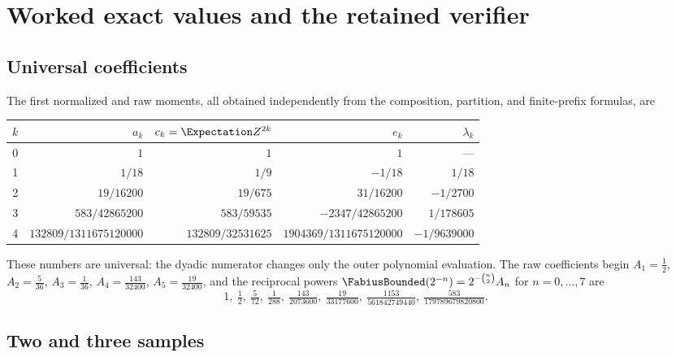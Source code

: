 \documentclass[11pt,oneside]{article}
\theoremstyle{plain}
\theoremstyle{definition}
\theoremstyle{remark}
\newcommand{\Fb}{\FabiusBounded}            %
\newcommand{\E}{\Expectation}
\begin{document}
\section{Worked exact values and the retained verifier}
\label{rf:sec:examples}

\subsection{Universal coefficients}
\label{rf:sec:examples-coefficients}

The first normalized and raw moments, all obtained independently from the
composition, partition, and finite-prefix formulas, are
\begin{center}
\renewcommand{\arraystretch}{1.3}
\small
\begin{tabular}{c@{\quad}r@{\quad}r@{\quad}r@{\quad}r}
\toprule
$k$ & $a_{k}$ & $c_{k}=\E Z^{2k}$ & $e_{k}$ & $\lambda_{k}$\\
\midrule
0 & $1$ & $1$ & $1$ & ---\\
1 & $1/18$ & $1/9$ & $-1/18$ & $1/18$\\
2 & $19/16200$ & $19/675$ & $31/16200$ & $-1/2700$\\
3 & $583/42865200$ & $583/59535$ & $-2347/42865200$ & $1/178605$\\
4 & $132809/1311675120000$ & $132809/32531625$ & $1904369/1311675120000$ & $-1/9639000$\\
\bottomrule
\end{tabular}
\end{center}
These numbers are universal: the dyadic numerator changes only the outer
polynomial evaluation.  The raw coefficients begin
$A_{1}=\tfrac12$, $A_{2}=\tfrac5{36}$, $A_{3}=\tfrac1{36}$,
$A_{4}=\tfrac{143}{32400}$, $A_{5}=\tfrac{19}{32400}$, and the reciprocal
powers $\Fb(2^{-n})=2^{-\binom{n}{2}}A_{n}$ for $n=0,\ldots,7$ are
\[
 1,\ \tfrac12,\ \tfrac5{72},\ \tfrac1{288},\ \tfrac{143}{2073600},\
 \tfrac{19}{33177600},\ \tfrac{1153}{561842749440},\ \tfrac{583}{179789679820800}.
\]

\subsection{Two and three samples}
\label{rf:sec:examples-extraction}
\end{document}
